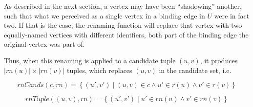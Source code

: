 \documentclass[../Master.tex]{subfiles}
\begin{document}
As described in the next section, a vertex may have been ``shadowing'' another, such that what we perceived as a single vertex in a binding edge in $U$ were in fact two. If that is the case, the renaming function will replace that vertex with two equally-named vertices with different identfiers, both part of the binding edge the original vertex was part of. 

Thus, when this renaming is applied to a candidate tuple $(u,v)$, it produces $|rn(u)| \times |rn(v)|$ tuples, which replaces $(u,v)$ in the candidate set, i.e.\ 

\begin{equation*}
    rnCands(c, rn) =
    \left\{ 
        \left( u', v' \right) \mid 
        (u, v) \in c \land u' \in r(u) \land v' \in r(v) 
    \right\}
\end{equation*}

%

\begin{equation*}
    rnTuple\left( (u,v), rn \right) =
    \left\{
        \left( u', v' \right) \mid u' \in rn(u) \land v' \in rn(v)
    \right\}
\end{equation*}
\end{document}
